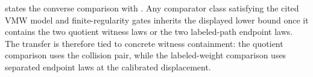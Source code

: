  states the converse comparison with \citet{VirkMazaheriWu2026}. Any comparator class satisfying the cited VMW model and finite-regularity gates inherits the displayed lower bound once it contains the two quotient witness laws or the two labeled-path endpoint laws. The transfer is therefore tied to concrete witness containment: the quotient comparison uses the collision pair, while the labeled-weight comparison uses separated endpoint laws at the calibrated displacement.
